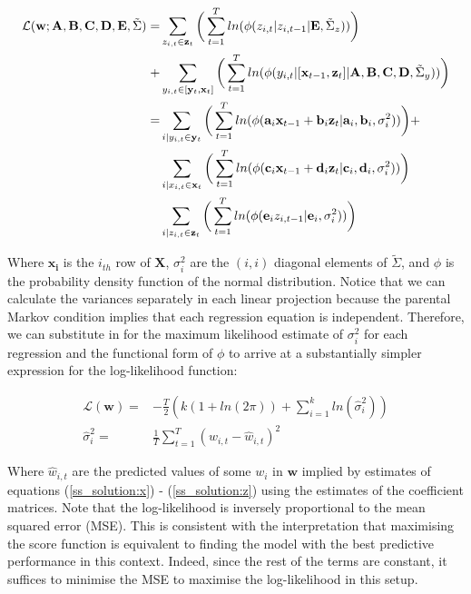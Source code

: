 \documentclass{article}
\begin{document}
\begin{align}
  \mathcal{L}(\mathbf{w}; \mathbf{A}, \mathbf{B}, \mathbf{C}, \mathbf{D}, \mathbf{E}, \tilde{\Sigma}) =& \sum_{z_{i,t} \in \mathbf{z}_t} \bigg{(} \sum_{t=1}^{T} ln(\phi(z_{i,t} | z_{i,t-1} | \mathbf{E}, \tilde{\Sigma}_z)) \bigg{)} \nonumber\\
  +& \sum_{y_{i,t} \in [\mathbf{y}_t,\mathbf{x}_t]} \bigg{(} \sum_{t=1}^{T} ln(\phi(y_{i,t} | [\mathbf{x}_{t-1}, \mathbf{z}_{t}] | \mathbf{A}, \mathbf{B}, \mathbf{C}, \mathbf{D}, \tilde{\Sigma}_y)) \bigg{)} \\
  =& \sum_{i | y_{i,t} \in \mathbf{y}_t} \bigg{(} \sum_{t=1}^{T} ln(\phi(\mathbf{a}_i \mathbf{x}_{t-1} + \mathbf{b}_i \mathbf{z}_t | \mathbf{a}_i, \mathbf{b}_i, \sigma_i^2)) \bigg{)} + \nonumber\\
  & \sum_{i | x_{i,t} \in \mathbf{x}_t} \bigg{(} \sum_{t=1}^{T} ln(\phi(\mathbf{c}_i \mathbf{x}_{t-1} + \mathbf{d}_i \mathbf{z}_t | \mathbf{c}_i, \mathbf{d}_i, \sigma_i^2)) \bigg{)} \nonumber\\
  & \sum_{i | z_{i,t} \in \mathbf{z}_t} \bigg{(} \sum_{t=1}^{T} ln(\phi(\mathbf{e}_i z_{i,t-1}  | \mathbf{e}_i, \sigma_i^2)) \bigg{)}
\end{align}

Where $\mathbf{x_i}$ is the $i_{th}$ row of $\mathbf{X}$, $\sigma_i^2$ are the $(i, i)$ diagonal elements of $\tilde{\Sigma}$, and $\phi$ is the probability density function of the normal distribution. Notice that we can calculate the variances separately in each linear projection because the parental Markov condition implies that each regression equation is independent. Therefore, we can substitute in for the maximum likelihood estimate of $\sigma_i^2$ for each regression and the functional form of $\phi$ to arrive at a substantially simpler expression for the log-likelihood function:

\begin{align}
  \mathcal{L(\mathbf{w})} =& -\frac{T}{2} \left( 
  k \left( 1 + ln(2\pi) \right) +
  \sum_{i=1}^{k} ln(\hat{\sigma}_{i}^2)
  \right) \\
  \hat{\sigma}_{i}^2 =& \frac{1}{T} \sum_{t=1}^{T} (w_{i,t} - \hat{w}_{i,t})^2
\end{align}

Where $\hat{w}_{i,t}$ are the predicted values of some $w_i$ in $\mathbf{w}$ implied by estimates of equations (\ref{ss_solution:x}) - (\ref{ss_solution:z}) using the estimates of the coefficient matrices. Note that the log-likelihood is inversely proportional to the mean squared error (MSE). This is consistent with the interpretation that maximising the score function is equivalent to finding the model with the best predictive performance in this context. Indeed, since the rest of the terms are constant, it suffices to minimise the MSE to maximise the log-likelihood in this setup.
\end{document}
